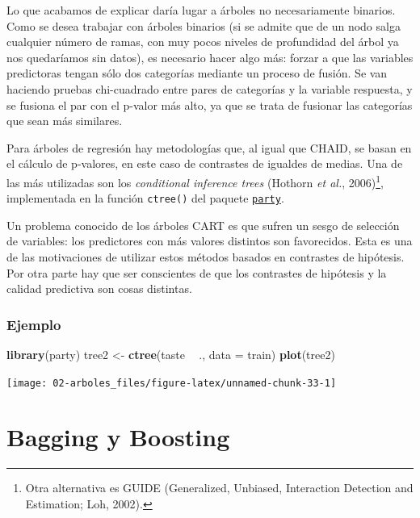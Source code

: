 \documentclass[
]{book}
\newenvironment{Shaded}{\begin{snugshade}}{\end{snugshade}}
\newcommand{\DataTypeTok}[1]{\textcolor[rgb]{0.13,0.29,0.53}{#1}}
\newcommand{\KeywordTok}[1]{\textcolor[rgb]{0.13,0.29,0.53}{\textbf{#1}}}
\newcommand{\NormalTok}[1]{#1}
\newcommand{\OperatorTok}[1]{\textcolor[rgb]{0.81,0.36,0.00}{\textbf{#1}}}
\newcommand{\StringTok}[1]{\textcolor[rgb]{0.31,0.60,0.02}{#1}}
\theoremstyle{break}
\theoremstyle{definition}
\theoremstyle{definition}
\theoremstyle{definition}
\theoremstyle{remark}
\begin{document}
Lo que acabamos de explicar daría lugar a árboles no necesariamente binarios.
Como se desea trabajar con árboles binarios (si se admite que de un nodo salga cualquier número de ramas, con muy pocos niveles de profundidad del árbol ya nos quedaríamos sin datos), es necesario hacer algo más: forzar a que las variables predictoras tengan sólo dos categorías mediante un proceso de fusión.
Se van haciendo pruebas chi-cuadrado entre pares de categorías y la variable respuesta, y se fusiona el par con el p-valor más alto, ya que se trata de fusionar las categorías que sean más similares.

Para árboles de regresión hay metodologías que, al igual que CHAID, se basan en el cálculo de p-valores, en este caso de contrastes de igualdes de medias.
Una de las más utilizadas son los \emph{conditional inference trees} (Hothorn \emph{et al.}, 2006)\footnote{Otra alternativa es GUIDE (Generalized, Unbiased, Interaction Detection and Estimation; Loh, 2002).}, implementada en la función \texttt{ctree()} del paquete \href{https://CRAN.R-project.org/package=party}{\texttt{party}}.

Un problema conocido de los árboles CART es que sufren un sesgo de selección de variables: los predictores con más valores distintos son favorecidos.
Esta es una de las motivaciones de utilizar estos métodos basados en contrastes de hipótesis.
Por otra parte hay que ser conscientes de que los contrastes de hipótesis y la calidad predictiva son cosas distintas.

\hypertarget{ejemplo}{%
\subsection{Ejemplo}\label{ejemplo}}

\begin{Shaded}
\begin{Highlighting}[]
\KeywordTok{library}\NormalTok{(party)}
\NormalTok{tree2 <-}\StringTok{ }\KeywordTok{ctree}\NormalTok{(taste }\OperatorTok{~}\StringTok{ }\NormalTok{., }\DataTypeTok{data =}\NormalTok{ train) }
\KeywordTok{plot}\NormalTok{(tree2)}
\end{Highlighting}
\end{Shaded}

\begin{center}\texttt{[image: 02-arboles\_files/figure-latex/unnamed-chunk-33-1]} \end{center}

\hypertarget{bagging-boosting}{%
\chapter{Bagging y Boosting}\label{bagging-boosting}}
\end{document}

